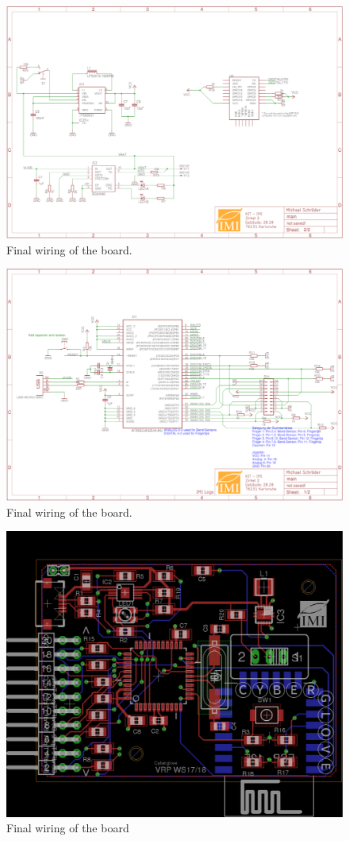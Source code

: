 \begin{figure}[!h]
	\centering
	\includegraphics[width=.85\textwidth]{./images/image2.png}
	\caption{Final wiring of the board.}
	\label{img:board1}
\end{figure}
\begin{figure}[!h]
	\centering
	\includegraphics[width=.85\textwidth]{./images/image3.png}
	\caption{Final wiring of the board.}
	\label{img:board2}
\end{figure}
\begin{figure}[!h]
	\centering
	\includegraphics[width=.7\textwidth]{./images/image4.png}
	\caption{Final wiring of the board}
	\label{img:board3}
\end{figure}

